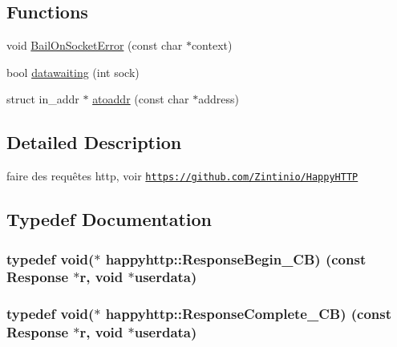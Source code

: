 \subsection*{Functions}
\begin{DoxyCompactItemize}
\item 
void \hyperlink{namespacehappyhttp_a28d6e69df779b4079771aa26420078d1}{Bail\+On\+Socket\+Error} (const char $\ast$context)
\item 
bool \hyperlink{namespacehappyhttp_a6cda4ba9b251fc1140e89c1268d88bca}{datawaiting} (int sock)
\item 
struct in\+\_\+addr $\ast$ \hyperlink{namespacehappyhttp_ade5d16bd091558cb861802fbbfece7fd}{atoaddr} (const char $\ast$address)
\end{DoxyCompactItemize}


\subsection{Detailed Description}
faire des requêtes http, voir \href{https://github.com/Zintinio/HappyHTTP}{\tt https\+://github.\+com/\+Zintinio/\+Happy\+H\+T\+TP} 

\subsection{Typedef Documentation}
\subsubsection[{\texorpdfstring{Response\+Begin\+\_\+\+CB}{ResponseBegin_CB}}]{\setlength{\rightskip}{0pt plus 5cm}typedef void($\ast$ happyhttp\+::\+Response\+Begin\+\_\+\+CB) (const {\bf Response} $\ast$r, void $\ast$userdata)}\hypertarget{namespacehappyhttp_a1997a4fe11e48d3b2b6bedbb246e8975}{}\label{namespacehappyhttp_a1997a4fe11e48d3b2b6bedbb246e8975}
\subsubsection[{\texorpdfstring{Response\+Complete\+\_\+\+CB}{ResponseComplete_CB}}]{\setlength{\rightskip}{0pt plus 5cm}typedef void($\ast$ happyhttp\+::\+Response\+Complete\+\_\+\+CB) (const {\bf Response} $\ast$r, void $\ast$userdata)}\hypertarget{namespacehappyhttp_ae70d6705a8684783ce996b296e181ede}{}\label{namespacehappyhttp_ae70d6705a8684783ce996b296e181ede}
